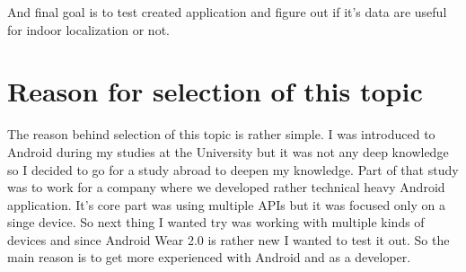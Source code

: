 And final goal is to test created application and figure out if it's data are useful for indoor localization or not.

\section{Reason for selection of this topic}\label{sec:ReasonForSelectionOfThisTopic}
The reason behind selection of this topic is rather simple. I was introduced to Android during my studies at the University but it was not any deep knowledge so I decided to go for a study abroad to deepen my knowledge. Part of that study was to work for a company where we developed rather technical heavy Android application. It's core part was using multiple APIs but it was focused only on a singe device. So next thing I wanted try was working with multiple kinds of devices and since Android Wear 2.0 is rather new I wanted to test it out. So the main reason is to get more experienced with Android and as a developer.
